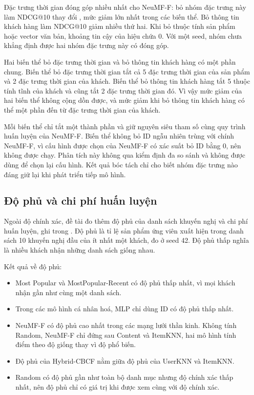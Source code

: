 Đặc trưng thời gian đóng góp nhiều nhất cho NeuMF-F: bỏ nhóm đặc trưng này làm NDCG@10 thay đổi , mức giảm lớn nhất trong các biến thể. Bỏ thông tin khách hàng làm NDCG@10 giảm nhiều thứ hai. Khi bỏ thuộc tính sản phẩm hoặc vector văn bản, khoảng tin cậy của hiệu chứa 0. Với một seed, nhóm chưa khẳng định được hai nhóm đặc trưng này có đóng góp.

Hai biến thể bỏ đặc trưng thời gian và bỏ thông tin khách hàng có một phần chung. Biến thể bỏ đặc trưng thời gian tắt cả 5 đặc trưng thời gian của sản phẩm và 2 đặc trưng thời gian của khách. Biến thể bỏ thông tin khách hàng tắt 5 thuộc tính tĩnh của khách và cũng tắt 2 đặc trưng thời gian đó. Vì vậy mức giảm của hai biến thể không cộng dồn được, và mức giảm khi bỏ thông tin khách hàng có thể một phần đến từ đặc trưng thời gian của khách.

Mỗi biến thể chỉ tắt một thành phần và giữ nguyên siêu tham số cùng quy trình huấn luyện của NeuMF-F. Biến thể không bỏ ID ngẫu nhiên trùng với chính NeuMF-F, vì cấu hình được chọn của NeuMF-F có xác suất bỏ ID bằng 0, nên không được chạy. Phân tích này không qua kiểm định đa so sánh và không được dùng để chọn lại cấu hình. Kết quả bóc tách chỉ cho biết nhóm đặc trưng nào đáng giữ lại khi phát triển tiếp mô hình.



\subsection{Độ phủ và chi phí huấn luyện}
\label{subsec:beyond_results}

Ngoài độ chính xác, đề tài đo thêm độ phủ của danh sách khuyến nghị và chi phí huấn luyện, ghi trong . Độ phủ là tỉ lệ sản phẩm ứng viên xuất hiện trong danh sách 10 khuyến nghị đầu của ít nhất một khách, đo ở seed 42. Độ phủ thấp nghĩa là nhiều khách nhận những danh sách giống nhau.

Kết quả về độ phủ:
\begin{itemize}
    \item Most Popular và MostPopular-Recent có độ phủ thấp nhất, vì mọi khách nhận gần như cùng một danh sách.
    \item Trong các mô hình cá nhân hoá, MLP chỉ dùng ID có độ phủ thấp nhất.
    \item NeuMF-F có độ phủ cao nhất trong các mạng lưới thần kinh. Không tính Random, NeuMF-F chỉ đứng sau Content và ItemKNN, hai mô hình tính điểm theo độ giống thay vì độ phổ biến.
    \item Độ phủ của Hybrid-CBCF nằm giữa độ phủ của UserKNN và ItemKNN.
    \item Random có độ phủ gần như toàn bộ danh mục nhưng độ chính xác thấp nhất, nên độ phủ chỉ có giá trị khi được xem cùng với độ chính xác.
\end{itemize}

